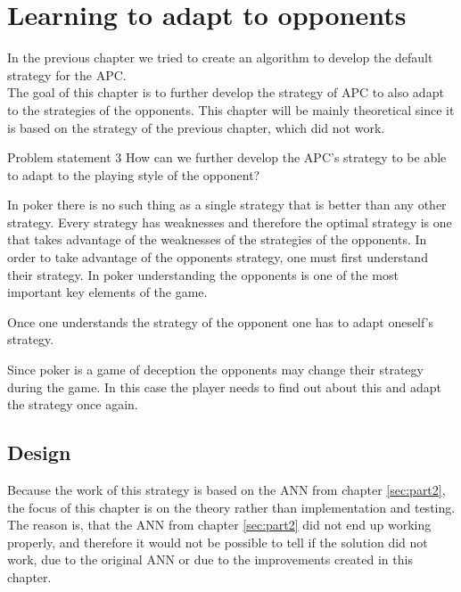 \section{Learning to adapt to opponents}
\label{sec:part3}

In the previous chapter we tried to create an algorithm to develop the default strategy for the APC. \\

The goal of this chapter is to further develop the strategy of APC to also adapt to the strategies of the opponents. This chapter will be mainly theoretical since it is based on the strategy of the previous chapter, which did not work.

\vspace{4mm}
\begin{statementBox2}{Problem statement 3}
How can we further develop the APC's strategy to be able to adapt to the playing style of the opponent?
\end{statementBox2}
\vspace{4mm} 

In poker there is no such thing as a single strategy that is better than any other strategy. Every strategy has weaknesses and therefore the optimal strategy is one that takes advantage of the weaknesses of the strategies of the opponents. In order to take advantage of the opponents strategy, one must first understand their strategy. In poker understanding the opponents is one of the most important key elements of the game. 

Once one understands the strategy of the opponent one has to adapt oneself's strategy.

Since poker is a game of deception the opponents may change their strategy during the game. In this case the player needs to find out about this and adapt the strategy once again. 

\subsection{Design}
Because the work of this strategy is based on the ANN from chapter \ref{sec:part2}, the focus of this chapter is on the theory rather than implementation and testing. The reason is, that the ANN from chapter \ref{sec:part2} did not end up working properly, and therefore it would not be possible to tell if the solution did not work, due to the original ANN or due to the improvements created in this chapter. 

